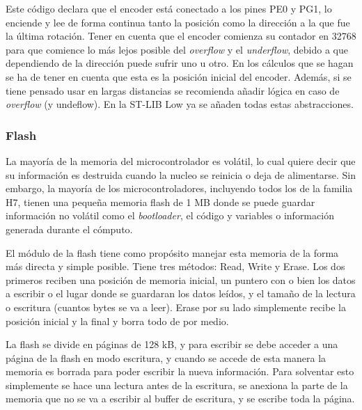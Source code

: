 \documentclass{report}
\begin{document}
\par \vspace{0.3cm}
Este código declara que el encoder está conectado a los pines PE0 y PG1, lo enciende y lee de forma continua tanto la posición como la dirección a la que fue la última rotación. Tener en cuenta que el encoder comienza su contador en 32768 para que comience lo más lejos posible del \textit{overflow} y el \textit{underflow}, debido a que dependiendo de la dirección puede sufrir uno u otro. En los cálculos que se hagan se ha de tener en cuenta que esta es la posición inicial del encoder. Además, si se tiene pensado usar en largas distancias se recomienda añadir lógica en caso de \textit{overflow} (y undeflow). En la ST-LIB Low ya se añaden todas estas abstracciones.
\subsubsection{Flash}
La mayoría de la memoria del microcontrolador es volátil, lo cual quiere decir que su información es destruida cuando la nucleo se reinicia o deja de alimentarse. Sin embargo, la mayoría de los microcontroladores, incluyendo todos los de la familia H7, tienen una pequeña memoria flash de 1 MB donde se puede guardar información no volátil como el \textit{bootloader}, el código y variables o información generada durante el cómputo. \par
El módulo de la flash tiene como propósito manejar esta memoria de la forma más directa y simple posible. Tiene tres métodos: Read, Write y Erase. Los dos primeros reciben una posición de memoria inicial, un puntero con o bien los datos a escribir o el lugar donde se guardaran los datos leídos, y el tamaño de la lectura o escritura (cuantos bytes se va a leer). Erase por su lado simplemente recibe la posición inicial y la final y borra todo de por medio. \par \vspace{0.3cm}
La flash se divide en páginas de 128 kB, y para escribir se debe acceder a una página de la flash en modo escritura, y cuando se accede de esta manera la memoria es borrada para poder escribir la nueva información. Para solventar esto simplemente se hace una lectura antes de la escritura, se anexiona la parte de la memoria que no se va a escribir al buffer de escritura, y se escribe toda la página.
\end{document}
